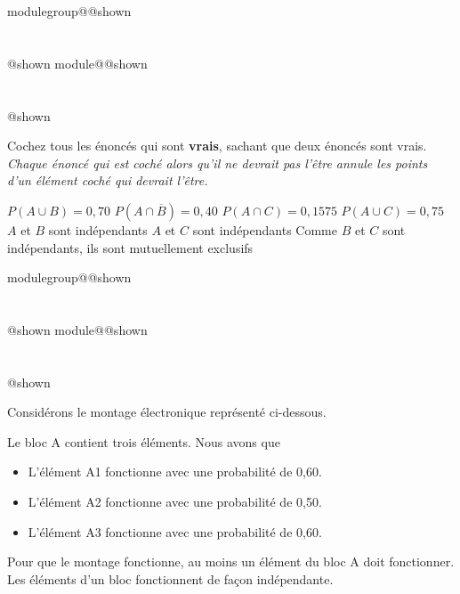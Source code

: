 \documentclass{Evaluation}
\makeatletter
\newcommand{\currentmodulekey}{}
\newcommand{\currentmoduletitle}{}
\newcommand{\currentgroupkey}{}
\newcommand{\currentgrouptitle}{}
\newcommand{\showmoduleifneeded}{%
  \ifx\currentgroupkey\empty\else
    \expandafter\ifx\csname modulegroup@\currentgroupkey @shown\endcsname\relax
      \section*{\currentgrouptitle}%
      \expandafter\gdef\csname modulegroup@\currentgroupkey @shown\endcsname{1}%
    \fi
  \fi
  \expandafter\ifx\csname module@\currentmodulekey @shown\endcsname\relax
    \section*{\currentmoduletitle}%
    \expandafter\gdef\csname module@\currentmodulekey @shown\endcsname{1}%
  \fi
}
\newenvironment{A25}{\showmoduleifneeded}{}
\makeatother
\begin{document}
\begin{questions}
\begin{A25}
Cochez tous les énoncés qui sont \textbf{vrais}, sachant que deux énoncés sont vrais. \textit{Chaque énoncé qui est coché alors qu'il ne devrait pas l'être annule les points d'un élément coché qui devrait l'être.}
\begin{checkboxes}
\choice $P(A \cup B) = 0,70$
\correctchoice $ P(A \cap \overline{B}) = 0,40 $
\choice $ P(A \cap C) = 0,1575 $
\choice $ P(A \cup C) = 0,75 $
\choice $A$ et $B$ sont indépendants
\correctchoice $A$ et $C$ sont indépendants
\choice Comme $B$ et $C$ sont indépendants, ils sont mutuellement exclusifs
\end{checkboxes}
\end{A25}

\begin{A25}
\question {} %
Considérons le montage électronique représenté ci-dessous.
	
\begin{figure}[h!]
    
    \begin{center}	 \end{center}
\end{figure}
	
 Le bloc A contient trois éléments. Nous avons que
\begin{itemize}
    \item L'élément A1 fonctionne avec une probabilité de 0,60.
    \item L'élément A2 fonctionne avec une probabilité de 0,50.
    \item L'élément A3 fonctionne avec une probabilité de 0,60.
\end{itemize}
Pour que le montage fonctionne, au moins un élément du bloc A doit fonctionner. Les éléments d'un bloc fonctionnent de façon indépendante.
	


\end{A25}
\end{questions}
\end{document}
